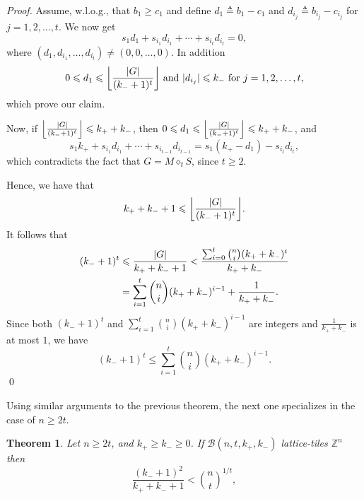 \documentclass[sort&compress]{elsarticle}
\DeclarePairedDelimiter\abs{\lvert}{\rvert}
\DeclarePairedDelimiter\floor{\lfloor}{\rfloor}
\renewcommand{\leq}{\leqslant}
\renewcommand{\geq}{\geqslant}
\newtheorem{theorem}{Theorem}
\newcommand{\Z}{\mathbb{Z}}
\newcommand{\kp}{k_+}
\newcommand{\km}{k_-}
\newcommand{\BALL}{{\mathcal B}(n,t,\kp,\km)}
\newcommand{\eqdef}{\triangleq}
\newcommand{\splt}{\diamond}
\begin{document}
\begin{proof}
  Assume, w.l.o.g., that $b_1\geq c_1$ and define $d_1\eqdef b_1-c_1$ and
  $d_{i_j}\eqdef b_{i_j}-c_{i_j}$ for $j=1,2,\ldots,t.$ We now get
  \[s_1d_1+s_{i_1}d_{i_1}+\cdots +s_{i_t}d_{i_t} = 0,\]
  where $(d_1,d_{i_1},\ldots, d_{i_t})\neq (0,0,\ldots,0)$. In addition 
  \[0\leq d_1 \leq  \floor*{  \frac{\abs{G}}{(\km+1)^t}} \text{\ and }  \abs{d_{i_j}}\leq \km \text{\ for }  j=1,2,\ldots,t,\]
which prove  our claim.
 
 Now, if $ \floor*{  \frac{\abs{G}}{(\km+1)^t}} \leq \kp+\km$, then $0\leq d_1 \leq  \floor*{  \frac{\abs{G}}{(\km+1)^t}} \leq \kp+\km$, and
  \[s_1\kp+s_{i_1}d_{i_1}+\cdots+s_{i_{t-1}}d_{i_{t-1}} = s_1 (\kp-d_1)
  -s_{i_t}d_{i_t},\]
  which contradicts the fact that $G=M\splt_t S$, since $t\geq 2$. 
  
  Hence, we have that 
  \begin{equation*}%
    \kp+\km+1\leq \floor*{  \frac{\abs{G}}{(\km+1)^t}}.
  \end{equation*}
  It follows  that
  \begin{align*}
    (\km+1)^t &\leq \frac{\abs{G}}{\kp+\km+1 } <  \frac{\sum_{i=0}^t \binom{n}{i} (\kp+\km)^i }{ \kp+\km} \\
    &= \sum_{i=1}^t \binom{n}{i} (\kp+\km)^{i-1}+\frac{1}{\kp+\km}.
  \end{align*}
  Since both $(\km+1)^t$ and $\sum_{i=1}^t \binom{n}{i}
  (\kp+\km)^{i-1}$ are integers and $\frac{1}{\kp+\km}$ is at most
  $1$, we have
  \[(\km+1)^t \leq \sum_{i=1}^t \binom{n}{i}(\kp+\km)^{i-1}.\]
\qed\end{proof}

Using similar arguments to the previous theorem, the next one
specializes in the case of $n\geq 2t$.

\begin{theorem}\label{thm:lattice-sym}
Let $n\geq 2t$, and $\kp\geq\km\geq 0$.  If $\BALL$ lattice-tiles $\Z^n$ then
\[\frac{(\km+1)^2}{\kp+\km+1} < \binom{n}{t}^{1/t},\]
\end{theorem}
\end{document}
